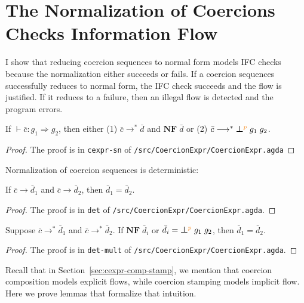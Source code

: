 \section{The Normalization of Coercions Checks Information Flow}
\label{sec:norm-IF}

I show that reducing coercion sequences to normal form models IFC checks because
the normalization either succeeds or fails. If a coercion sequences successfully
reduces to normal form, the IFC check succeeds and the flow is justified. If it
reduces to a failure, then an illegal flow is detected and the program errors.

\begin{lemma}
If $\vdash \bar{c} : g_1 \Rightarrow g_2$, then either
(1) $\bar{c} \longrightarrow^{*} \bar{d}$ and $\mathbf{NF}\;\bar{d}$ or
(2) $\bar{c} \longrightarrow^{*} \err{g_1}{g_2}{p}$.
\end{lemma}
\begin{proof}
  The proof is in \texttt{cexpr-sn} of
  \texttt{/src/CoercionExpr/CoercionExpr.agda}
\end{proof}

\noindent Normalization of coercion sequences is deterministic:

\begin{lemma}
If $\bar{c} \longrightarrow \bar{d}_1$ and $\bar{c} \longrightarrow \bar{d}_2$,
then $\bar{d}_1 = \bar{d}_2$.
\end{lemma}
\begin{proof}
  The proof is in \texttt{det} of \texttt{/src/CoercionExpr/CoercionExpr.agda}.
\end{proof}

\begin{lemma}
Suppose $\bar{c} \longrightarrow^{*} \bar{d}_1$
and $\bar{c} \longrightarrow^{*} \bar{d}_2$.
If $\mathbf{NF}\;\bar{d}_i$ or $\bar{d}_i = \err{g_1}{g_2}{p}$,
then $\bar{d}_1 = \bar{d}_2$.
\end{lemma}
\begin{proof}
  The proof is in \texttt{det-mult} of \texttt{/src/CoercionExpr/CoercionExpr.agda}.
\end{proof}

Recall that in Section~\ref{sec:cexpr-comp-stamp}, we mention that coercion
composition models explicit flows, while coercion stamping models implicit flow.
Here we prove lemmas that formalize that intuition.

